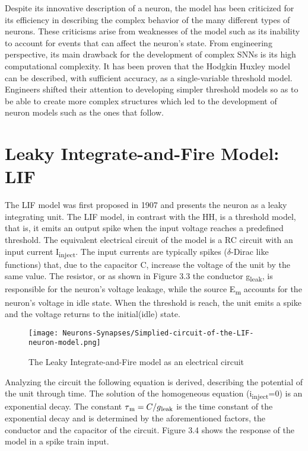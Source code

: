 \documentclass[12pt]{report}
\begin{document}
Despite its innovative description of a neuron, the model has been criticized for its efficiency in describing the complex behavior of the many different types of neurons. These criticisms arise from weaknesses of the model such as its inability to account for events that can affect the neuron's state\cite{limit1993}. From engineering perspective, its main drawback for the development of complex SNNs is its high computational complexity. It has been proven \cite{reduction1997} that the Hodgkin Huxley model can be described, with sufficient accuracy, as a single-variable threshold model. Engineers shifted their attention to developing simpler threshold models so as to be able to create more complex structures which led to the development of neuron models such as the ones that follow.

\medskip

\section{Leaky Integrate-and-Fire Model: LIF}

The LIF model was first proposed in 1907 \cite{Brunel2007} and presents the neuron as a leaky integrating unit. The LIF model, in contrast with the HH, is a threshold model, that is, it emits an output spike when the input voltage reaches a predefined threshold. The equivalent electrical circuit of the model is a RC circuit with an input current I\textsubscript{inject}. The input currents are typically spikes (\(\delta\)-Dirac like functions) that, due to the capacitor C, increase the voltage of the unit by the same value. The resistor, or as shown in Figure 3.3 the conductor g\textsubscript{leak}, is responsible for the neuron's voltage leakage, while the source E\textsubscript{m} accounts for the neuron's voltage in idle state. When the threshold is reach, the unit emits a spike and the voltage returns to the initial(idle) state.

\begin{figure}[htp]
    \centering
    \texttt{[image: Neurons-Synapses/Simplied-circuit-of-the-LIF-neuron-model.png]}
    \caption{The Leaky Integrate-and-Fire model as an electrical circuit}
    \label{fig:lif-circuit}
\end{figure}

\vspace{5mm}

Analyzing the circuit the following equation is derived, describing the potential of the unit through time. The solution of the homogeneous equation (i\textsubscript{inject}=0) is an exponential decay. The constant \(\tau\textsubscript{m}=C/g\textsubscript{leak}\) is the time constant of the exponential decay and is determined by the aforementioned factors, the conductor and the capacitor of the circuit. Figure 3.4 shows the response of the model in a spike train input.
\end{document}
